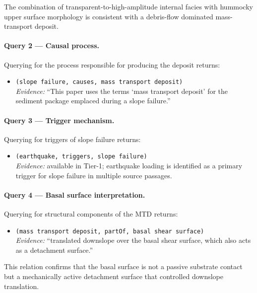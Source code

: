 \documentclass[10pt]{article}
\begin{document}
The combination of transparent-to-high-amplitude
internal facies with hummocky upper surface
morphology is consistent with a debris-flow dominated
mass-transport deposit.

\paragraph{Query 2 — Causal process.}
Querying for the process responsible for producing
the deposit returns:

\begin{itemize}
  \item \texttt{(slope failure, causes,
  mass transport deposit)}\\
  \textit{Evidence:} ``This paper uses the terms
  `mass transport deposit' for the sediment package
  emplaced during a slope failure.''
\end{itemize}

\paragraph{Query 3 — Trigger mechanism.}
Querying for triggers of slope failure returns:

\begin{itemize}
  \item \texttt{(earthquake, triggers,
  slope failure)}\\
  \textit{Evidence:} available in Tier-1; earthquake
  loading is identified as a primary trigger for
  slope failure in multiple source passages.
\end{itemize}

\paragraph{Query 4 — Basal surface interpretation.}
Querying for structural components of the MTD
returns:

\begin{itemize}
  \item \texttt{(mass transport deposit, partOf,
  basal shear surface)}\\
  \textit{Evidence:} ``translated downslope over
  the basal shear surface, which also acts as a
  detachment surface.''
\end{itemize}

This relation confirms that the basal surface is
not a passive substrate contact but a mechanically
active detachment surface that controlled downslope
translation.
\end{document}
